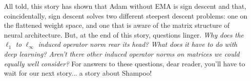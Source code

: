 \ornament

All told, this story has shown that Adam without EMA is sign descent and that, coincidentally, sign descent solves two different steepest descent problems: one on the flattened weight space, and one that is aware of the matrix structure of neural architecture. But, at the end of this story, questions linger. \textit{Why does the $\ell_1$ to $\ell_\infty$ induced operator norm rear its head? What does it have to do with deep learning? Aren't there other induced operator norms on matrices we could equally well consider?} For answers to these questions, dear reader, you'll have to wait for our next story... a story about Shampoo!
